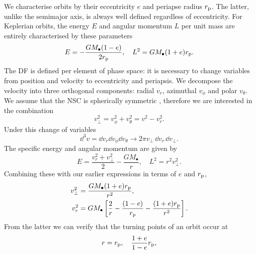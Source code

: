We characterise orbits by their eccentricity $e$ and periapse radius $r_\mathrm{p}$. The latter, unlike the semimajor axis, is always well defined regardless of eccentricity. For Keplerian orbits, the energy $E$ and angular momentum $L$ per unit mass are entirely characterised by these parameters
\begin{equation}
\label{eq:Energy_ecc}
E = -\dfrac{GM_\bullet(1 - e)}{2r_\mathrm{p}}, \quad L^2 = GM_\bullet(1 + e)r_\mathrm{p}.
\end{equation}
The DF is defined per element of phase space: it is necessary to change variables from position and velocity to eccentricity and periapsis. We decompose the velocity into three orthogonal components: radial $v_r$, azimuthal $v_\phi$ and polar $v_\theta$. We assume that the NSC is spherically symmetric \citep{Genzel2003, Schodel2007}, therefore we are interested in the combination
\begin{equation}
v_\perp^2 = v_\phi^2 + v_\theta^2 = v^2 - v_r^2.
\end{equation}
Under this change of variables
\begin{equation}
\dd^3v = \dd v_r \dd v_\phi \dd v_\theta \rightarrow 2\pi v_\perp \,\dd v_r \,\dd v_\perp.
\end{equation}
The specific energy and angular momentum are given by
\begin{equation}
E = \dfrac{v_r^2 + v_\perp^2}{2} - \dfrac{GM_\bullet}{r}, \quad L^2 = r^2 v_\perp^2.
\end{equation}
Combining these with our earlier expressions in terms of $e$ and $r_\mathrm{p}$,
\begin{align}
v_\perp^2 = {} & \dfrac{GM_\bullet(1 + e)r_\mathrm{p}}{r^2}, \\
v_r^2 = {} & GM_\bullet\left[\dfrac{2}{r} - \dfrac{(1 - e)}{r_\mathrm{p}} - \dfrac{(1 + e)r_\mathrm{p}}{r^2}\right].
\end{align}
From the latter we can verify that the turning points of an orbit occur at
\begin{equation}
r = r_\mathrm{p}, \quad \dfrac{1+e}{1-e}r_\mathrm{p},
\end{equation}
